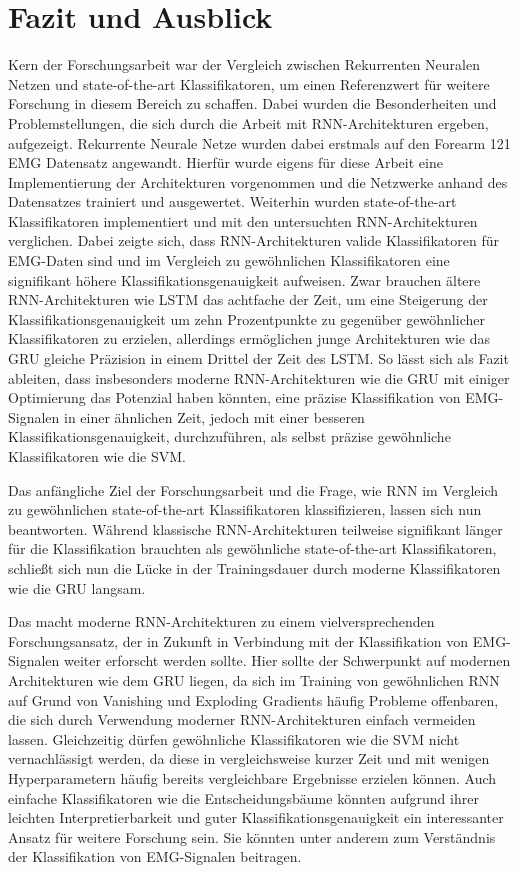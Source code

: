 \chapter{Fazit und Ausblick}
\label{chap:fazit}

Kern der Forschungsarbeit war der Vergleich zwischen Rekurrenten Neuralen Netzen und state-of-the-art Klassifikatoren, um einen Referenzwert für weitere Forschung in diesem Bereich zu schaffen. Dabei wurden die Besonderheiten und Problemstellungen, die sich durch die Arbeit mit RNN-Architekturen ergeben, aufgezeigt. Rekurrente Neurale Netze wurden dabei erstmals auf den \glqq Forearm 121 EMG\grqq{} Datensatz angewandt. Hierfür wurde eigens für diese Arbeit eine Implementierung der Architekturen vorgenommen und die Netzwerke anhand des Datensatzes trainiert und ausgewertet. Weiterhin wurden state-of-the-art Klassifikatoren implementiert und mit den untersuchten RNN-Architekturen verglichen. Dabei zeigte sich, dass RNN-Architekturen valide Klassifikatoren für EMG-Daten sind und im Vergleich zu gewöhnlichen Klassifikatoren eine signifikant höhere Klassifikationsgenauigkeit aufweisen. Zwar brauchen ältere RNN-Architekturen wie LSTM das achtfache der Zeit, um eine Steigerung der Klassifikationsgenauigkeit um zehn Prozentpunkte zu gegenüber gewöhnlicher Klassifikatoren zu erzielen, allerdings ermöglichen junge Architekturen wie das GRU gleiche Präzision in einem Drittel der Zeit des LSTM. So lässt sich als Fazit ableiten, dass insbesonders moderne RNN-Architekturen wie die GRU mit einiger Optimierung das Potenzial haben könnten, eine präzise Klassifikation von EMG-Signalen in einer ähnlichen Zeit, jedoch mit einer besseren Klassifikationsgenauigkeit, durchzuführen, als selbst präzise gewöhnliche Klassifikatoren wie die SVM.

Das anfängliche Ziel der Forschungsarbeit und die Frage, wie RNN im Vergleich zu gewöhnlichen state-of-the-art Klassifikatoren klassifizieren, lassen sich nun beantworten. Während klassische RNN-Architekturen teilweise signifikant länger für die Klassifikation brauchten als gewöhnliche state-of-the-art Klassifikatoren, schließt sich nun die Lücke in der Trainingsdauer durch moderne Klassifikatoren wie die GRU langsam.

Das macht moderne RNN-Architekturen zu einem vielversprechenden Forschungsansatz, der in Zukunft in Verbindung mit der Klassifikation von EMG-Signalen weiter erforscht werden sollte. Hier sollte der Schwerpunkt auf modernen Architekturen wie dem GRU liegen, da sich im Training von gewöhnlichen RNN auf Grund von Vanishing und Exploding Gradients häufig Probleme offenbaren, die sich durch Verwendung moderner RNN-Architekturen einfach vermeiden lassen. Gleichzeitig dürfen gewöhnliche Klassifikatoren wie die SVM nicht vernachlässigt werden, da diese in vergleichsweise kurzer Zeit und mit wenigen Hyperparametern häufig bereits vergleichbare Ergebnisse erzielen können. Auch einfache Klassifikatoren wie die Entscheidungsbäume könnten aufgrund ihrer leichten Interpretierbarkeit und guter Klassifikationsgenauigkeit ein interessanter Ansatz für weitere Forschung sein. Sie könnten unter anderem zum Verständnis der Klassifikation von EMG-Signalen beitragen.


